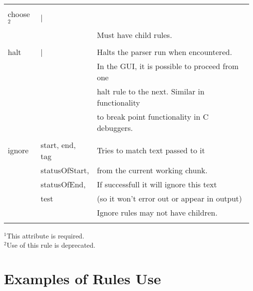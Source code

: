{\begin{table}
\begin{center}
\begin{tabular}{|lll|}
 & & \\
choose$^{2}$ & | & \\
 & & Must have child rules. \\
 & & \\
halt & | & Halts the parser run when encountered. \\
 & & In the GUI, it is possible to proceed from one \\
 & & halt rule to the next. Similar in functionality \\
 & & to break point functionality in C debuggers. \\
 & & \\
ignore & start, end, tag & Tries to match text passed to it\\
 & statusOfStart, & from the current working chunk. \\
 & statusOfEnd, & If successfull it will ignore this text \\
 & test & (so it won't error out or appear in output) \\
 & & Ignore rules may not have children. \\
 & & \\ \hline 
   \end{tabular}
  \end{center}
$^{1}$This attribute is required. \\ 
$^{2}$Use of this rule is deprecated.
\end{table}
}

\section{Examples of Rules Use} 

